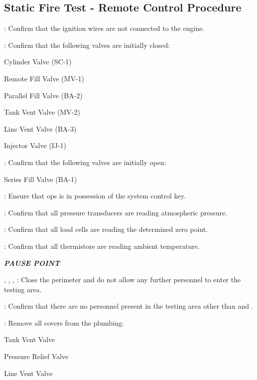 \subsection{Static Fire Test - Remote Control Procedure}
\begin{checklist}
	\item \secondary{}: Confirm that the ignition wires are not connected to the engine. 
	\item \primary{}: Confirm that the following valves are initially closed:
	\begin{checklist}
		\item Cylinder Valve (SC-1)
		\item Remote Fill Valve (MV-1)
		\item Parallel Fill Valve (BA-2)
		\item Tank Vent Valve (MV-2)
		\item Line Vent Valve (BA-3)
		\item Injector Valve (IJ-1)
	\end{checklist}
	\item \primary{}: Confirm that the following valves are initially open:
	\begin{checklist}
		\item Series Fill Valve (BA-1)
	\end{checklist}
	\item \ops{}: Ensure that ops is in possession of the system control key. 
	\item \daq{}: Confirm that all pressure transducers are reading atmospheric pressure. 
	\item \daq{}: Confirm that all load cells are reading the determined zero point. 
	\item \daq{}: Confirm that all thermistors are reading ambient temperature. 
	\item \textbf{\textit{PAUSE POINT}}
	\item \peri{}, \perii{}, \periii{}, \periv{}: Close the perimeter and do not allow any further personnel to enter the testing area. 
	\item \secondary{}: Confirm that there are no personnel present in the testing area other than \primary{} and \secondary{}.
	\item \primary{}: Remove all covers from the plumbing:
	\begin{checklist}
		\item Tank Vent Valve
		\item Pressure Relief Valve
		\item Line Vent Valve

\end{checklist}
\end{checklist}

